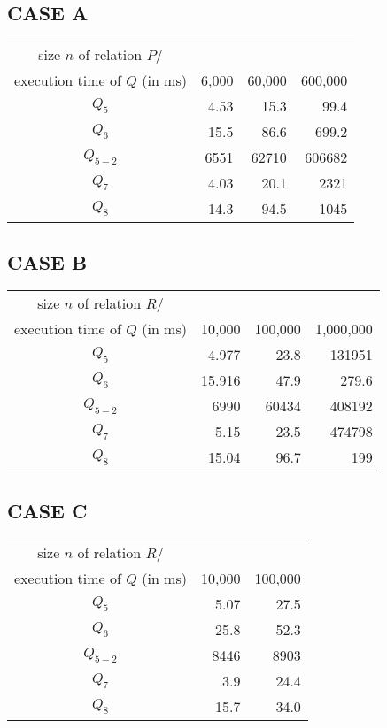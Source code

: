 \documentclass[10pt]{article}
\begin{document}
\subsection*{CASE A}
\begin{center}
\begin{tabular}{c|r|r|r}
size $n$ of relation $P/$ \\
execution time of $Q$ (in ms)
&
6,000&
60,000&
600,000
 \\ \hline
$Q_5$    & 4.53 &  15.3 & 99.4\\
$Q_6$    & 15.5 &  86.6 & 699.2\\
$Q_{5-2}$& 6551  & 62710 & 606682\\
$Q_7$    & 4.03 &  20.1 & 2321\\
$Q_8$    & 14.3  & 94.5 & 1045\\
\end{tabular}
\end{center}

\subsection*{CASE B}
\begin{center}
\begin{tabular}{c|r|r|r}
size $n$ of relation $R/$ \\
execution time of $Q$ (in ms)
&
10,000&
100,000&
1,000,000
 \\ \hline
$Q_5$    & 4.977 &  23.8 & 131951\\
$Q_6$    &15.916 &  47.9 & 279.6\\
$Q_{5-2}$& 6990 &  60434 & 408192\\
$Q_7$    & 5.15 &  23.5 & 474798\\
$Q_8$    & 15.04 &  96.7 & 199\\
\end{tabular}
\end{center}

\subsection*{CASE C}
\begin{center}
\begin{tabular}{c|r|r}
size $n$ of relation $R/$ \\
execution time of $Q$ (in ms)
&
10,000&
100,000
 \\ \hline
$Q_5$    & 5.07 &  27.5 \\
$Q_6$    & 25.8 &  52.3 \\
$Q_{5-2}$& 8446 &  8903 \\
$Q_7$    & 3.9 &   24.4 \\
$Q_8$    & 15.7 &  34.0 \\
\end{tabular}
\end{center}
\end{document}
